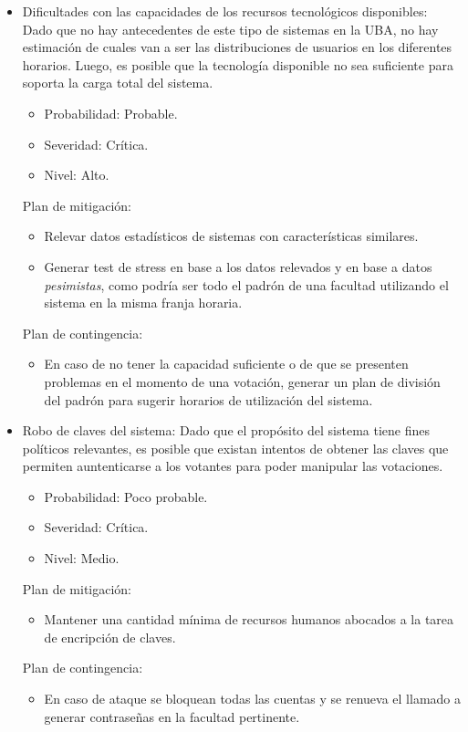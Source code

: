 \begin{itemize}
\bigskip

\item Dificultades con las capacidades de los recursos tecnol\'ogicos disponibles: Dado que no hay antecedentes de este tipo de sistemas en la UBA, no hay estimaci\'on de cuales van a ser las distribuciones de usuarios en los diferentes horarios. Luego, es posible que la tecnolog\'ia disponible no sea suficiente para soporta la carga total del sistema.
\begin{itemize}
\item Probabilidad: Probable.
\item Severidad: Cr\'itica.
\item Nivel: Alto.
\end{itemize}
\medskip
Plan de mitigación:
\begin{itemize}
\item Relevar datos estad\'isticos de sistemas con caracter\'isticas similares.
\item Generar test de stress en base a los datos relevados y en base a datos \emph{pesimistas}, como podr\'ia ser todo el padr\'on de una facultad utilizando el sistema en la misma franja horaria.
\end{itemize}
\medskip
Plan de contingencia:
\begin{itemize}
\item En caso de no tener la capacidad suficiente o de que se presenten problemas en el momento de una votaci\'on, generar un plan de divisi\'on del padr\'on para sugerir horarios de utilizaci\'on del sistema.
\end{itemize}

\bigskip



\item Robo de claves del sistema: Dado que el prop\'osito del sistema tiene fines pol\'iticos relevantes, es posible que existan intentos de obtener las claves que permiten auntenticarse a los votantes para poder manipular las votaciones.
\begin{itemize}
\item Probabilidad: Poco probable.
\item Severidad: Cr\'itica.
\item Nivel: Medio.
\end{itemize}
\medskip
Plan de mitigación:
\begin{itemize}
\item Mantener una cantidad m\'inima de recursos humanos abocados a la tarea de encripción de claves.
\end{itemize}
\medskip
Plan de contingencia:
\begin{itemize}
\item En caso de ataque se bloquean todas las cuentas y se renueva el llamado a generar contraseñas en la facultad pertinente.
\end{itemize}




\end{itemize}

